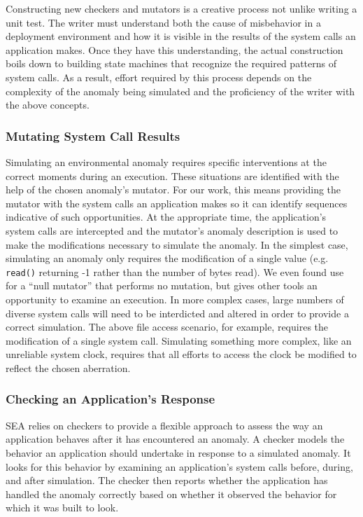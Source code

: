 Constructing new checkers and mutators is a creative process not unlike
writing a unit test.  The writer must understand both the cause of
misbehavior in a deployment environment and how it is visible in the
results of the system calls an application makes.  Once they have this
understanding, the actual construction boils down to building state
machines that recognize the required patterns of system calls.  As a
result, effort required by this process depends on the complexity of the
anomaly being simulated and the proficiency of the writer with the above
concepts.

\subsubsection{Mutating System Call Results}
\label{SUBSUB:MutatingCommunications}
Simulating an environmental anomaly requires specific interventions at the
correct moments during an execution.
These situations are identified
with the help of the chosen anomaly's
mutator.
For our work,
this means providing
the mutator
with the system calls
an application makes
so it can identify sequences
indicative of such opportunities.
At the appropriate time,
the application's system calls
are intercepted
and the mutator's anomaly description is used to
make the modifications necessary
to simulate the anomaly.
In the simplest case,
simulating an anomaly only requires
the modification of a single value
(e.g. {\tt read()} returning -1 rather than the number of bytes read).
We even found use for a ``null mutator''
that performs no mutation, but gives other tools an opportunity to examine an execution.
In more complex cases,
large numbers of diverse system calls
will need to be interdicted and altered
in order to provide a correct simulation.
The above file access scenario, for example,
requires the modification of a single system call.
Simulating something more complex,
like an unreliable system clock,
requires that all efforts
to access the clock
be modified to reflect the chosen aberration.

\subsubsection{Checking an Application's Response}
\label{SUBSUB:CheckingResponse}
SEA relies on checkers
to provide a flexible approach to assess the way an application
behaves after it has encountered an anomaly.
A checker models
the behavior an application should undertake
in response to a simulated anomaly.
It looks for this behavior by examining an application's system calls
before, during, and after simulation.
The checker then reports whether the application has handled
the anomaly correctly
based on whether it observed the behavior for which it was built to look.

